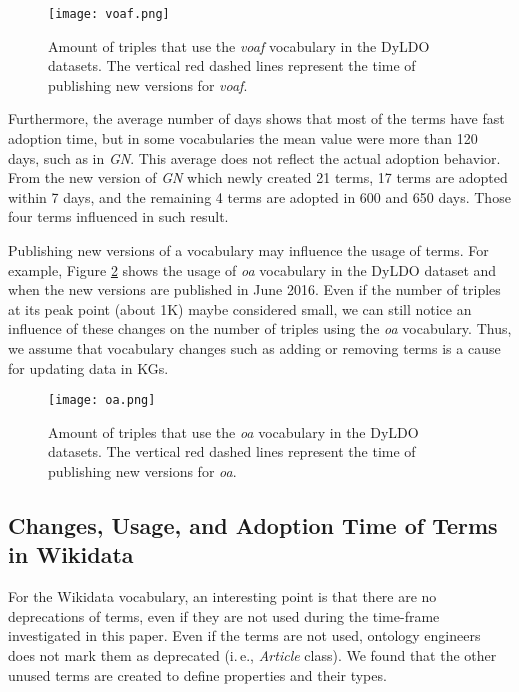 \begin{figure}
	\centering
	\texttt{[image: voaf.png]}
	\caption{Amount of triples that use the \textit{voaf} vocabulary in the DyLDO datasets. The vertical red dashed lines represent the time of publishing new versions for \textit{voaf}.}
	\label{fig:voaf}
\end{figure}

Furthermore, the average number of days shows that most of the terms have fast adoption time, but in some vocabularies the mean value were more than 120 days, such as in \textit{GN}. This average does not reflect the actual adoption behavior. From the new version of \textit{GN} which newly created 21 terms, 17 terms are adopted within 7 days, and the remaining 4 terms are adopted in 600 and 650 days. Those four terms influenced in such result.

Publishing new versions of a vocabulary may influence the usage of terms. 
For example, Figure \ref{fig:oa} shows the usage of \textit{oa} vocabulary in the DyLDO dataset and when the new versions are published in June 2016. Even if the number of triples at its peak point (about 1K) maybe considered small, we can still notice an influence of these changes on the number of triples using the \textit{oa} vocabulary. Thus, we assume that vocabulary changes such as adding or removing terms is a cause for updating data in KGs.


\begin{figure}
	\centering
	\texttt{[image: oa.png]}
	\caption{Amount of triples that use the \textit{oa} vocabulary in the DyLDO datasets. The vertical red dashed lines represent the time of publishing new versions for \textit{oa}.}
	\label{fig:oa}
\end{figure}


\subsection{Changes, Usage, and Adoption Time of Terms in Wikidata} \label{Wiki-disc}
For the Wikidata vocabulary, an interesting point is that there are no deprecations of terms, even if they are not used during the time-frame investigated in this paper. Even if the terms are not used, ontology engineers does not mark them as deprecated (i.\,e., \textit{Article} class). We found that the other unused terms are created to define properties and their types.

